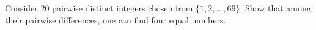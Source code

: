 Consider $20$ pairwise distinct integers chosen from $\{1, 2, \ldots, 69\}$. Show that among their pairwise differences, one can find four equal numbers.
